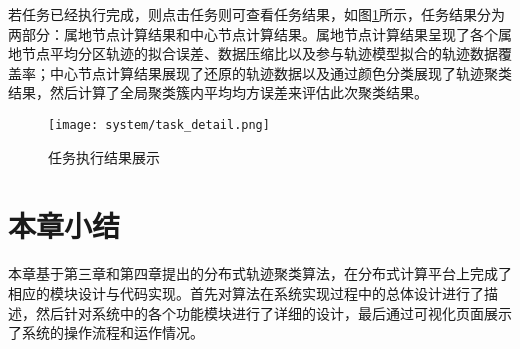 若任务已经执行完成，则点击任务则可查看任务结果，如图\ref{result}所示，任务结果分为两部分：属地节点计算结果和中心节点计算结果。属地节点计算结果呈现了各个属地节点平均分区轨迹的拟合误差、数据压缩比以及参与轨迹模型拟合的轨迹数据覆盖率；中心节点计算结果展现了还原的轨迹数据以及通过颜色分类展现了轨迹聚类结果，然后计算了全局聚类簇内平均均方误差来评估此次聚类结果。
\begin{figure}[H]
	\texttt{[image: system/task\_detail.png]}
	\caption{任务执行结果展示}
	\label{result}
\end{figure}

\section{本章小结}
本章基于第三章和第四章提出的分布式轨迹聚类算法，在分布式计算平台上完成了相应的模块设计与代码实现。首先对算法在系统实现过程中的总体设计进行了描述，然后针对系统中的各个功能模块进行了详细的设计，最后通过可视化页面展示了系统的操作流程和运作情况。